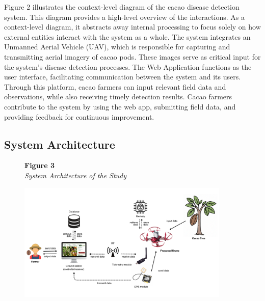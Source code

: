 Figure 2 illustrates the context-level diagram of the cacao disease detection system. This diagram provides a high-level overview of the interactions. As a context-level diagram, it abstracts away internal processing to focus solely on how external entities interact with the system as a whole. The system integrates an Unmanned Aerial Vehicle (UAV), which is responsible for capturing and transmitting aerial imagery of cacao pods. These images serve as critical input for the system’s disease detection processes. The Web Application functions as the user interface, facilitating communication between the system and its users. Through this platform, cacao farmers can input relevant field data and observations, while also receiving timely detection results. Cacao farmers contribute to the system by using the web app, submitting field data, and providing feedback for continuous improvement.

\subsection{System Architecture}

\begin{figure}[H]
	\raggedright
	\textbf{Figure 3} \\ %
	\textit{System Architecture of the Study} %

	\vspace{0.5em}
	\centering
	\includegraphics[width=0.9\textwidth]{figures/Sys_Arch.pdf} %

	\vspace{0.5em}
	\raggedright

	\label{fig:SysArch}
\end{figure}

